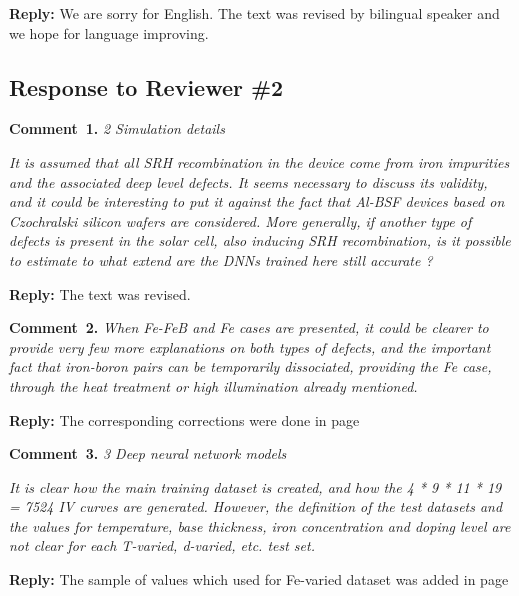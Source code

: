 \documentclass[num-refs]{wiley-article} %
\begin{document}
\vspace{0.5cm}
\noindent
\textcolor[rgb]{0.51,0.00,0.00}{\textbf{Reply:}}
We are sorry for English.
The text was revised by bilingual speaker and we hope for language improving.




\subsection*{Response to Reviewer \#2 }


\textcolor[rgb]{0.00,0.50,1.00}{\textbf{Comment~1.}}
\emph{2 Simulation details}

\emph{It is assumed that all SRH recombination in the device come from iron impurities and the associated deep level defects.
It seems necessary to discuss its validity, and it could be interesting to put it against the fact that Al-BSF devices based on Czochralski silicon wafers are considered.
More generally, if another type of defects is present in the solar cell, also inducing SRH recombination,
is it possible to estimate to what extend are the DNNs trained here still accurate ? }

\vspace{0.5cm}
\noindent
\textcolor[rgb]{0.51,0.00,0.00}{\textbf{Reply:}}
The text was revised.


\vspace{1cm}
\noindent
\textcolor[rgb]{0.00,0.50,1.00}{\textbf{Comment~2.}}
\emph{When Fe-FeB and Fe cases are presented, it could be clearer to provide very few more explanations on both types of defects,
and the important fact that iron-boron pairs can be temporarily dissociated, providing the Fe case,
through the heat treatment or high illumination already mentioned. }

\vspace{0.5cm}
\noindent
\textcolor[rgb]{0.51,0.00,0.00}{\textbf{Reply:}}
The corresponding corrections were done in page


\vspace{1cm}
\noindent
\textcolor[rgb]{0.00,0.50,1.00}{\textbf{Comment~3.}}
\emph{3 Deep neural network models}

\emph{
It is clear how the main training dataset is created, and how the 4 * 9 * 11 * 19 = 7524 IV curves are generated.
However, the definition of the test datasets and the values for temperature,
base thickness, iron concentration and doping level are not clear for each T-varied, d-varied, etc. test set. }

\vspace{0.5cm}
\noindent
\textcolor[rgb]{0.51,0.00,0.00}{\textbf{Reply:}}
The sample of values which used for Fe-varied dataset was added in page  
\end{document}
